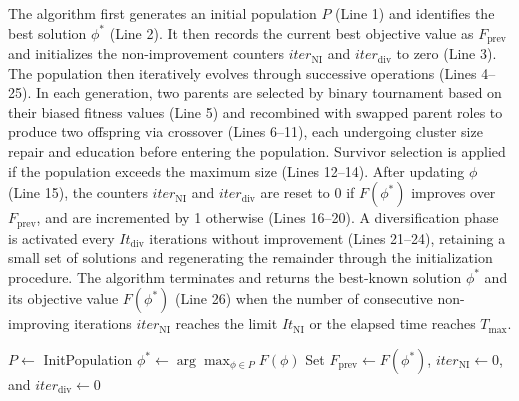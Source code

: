 The algorithm first generates an initial population $P$ (Line 1) and identifies the best solution $\phi^*$ (Line 2). It then records the current best objective value as ${{F}_{\text{prev}}}$ and initializes the non-improvement counters $ite{{r}_{\text{NI}}}$ and $ite{{r}_{\text{div}}}$ to zero (Line 3). The population then iteratively evolves through successive operations (Lines 4--25). In each generation, two parents are selected by binary tournament based on their biased fitness values (Line 5) and recombined with swapped parent roles to produce two offspring via crossover (Lines 6--11), each undergoing cluster size repair and education before entering the population. Survivor selection is applied if the population exceeds the maximum size (Lines 12--14). After updating $\phi$ (Line 15), the counters $ite{{r}_{\text{NI}}}$ and $ite{{r}_{\text{div}}}$ are reset to 0 if $F({{\phi }^{*}})$ improves over ${{F}_{\text{prev}}}$, and are incremented by 1 otherwise (Lines 16--20). A diversification phase is activated every $I{{t}_{\text{div}}}$ iterations without improvement (Lines 21--24), retaining a small set of solutions and regenerating the remainder through the initialization procedure. The algorithm terminates and returns the best-known solution $\phi^*$ and its objective value $F({{\phi }^{*}})$ (Line 26) when the number of consecutive non-improving iterations $ite{{r}_{\text{NI}}}$ reaches the limit $I{{t}_{\text{NI}}}$ or the elapsed time reaches ${{T}_{\max }}$.

\begin{algorithm}[htbp]
\caption{HGS-UC}
\label{alg:hgs-uc}
$P\leftarrow$ InitPopulation\;
$\phi^{*}\leftarrow \arg\max_{\phi\in P}F(\phi)$\;
Set $F_{\text{prev}}\leftarrow F(\phi^{*})$, $iter_{\text{NI}}\leftarrow 0$, and $iter_{\text{div}}\leftarrow 0$\;
\end{algorithm}

